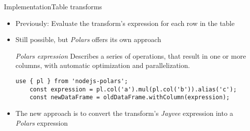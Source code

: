 \begin{frame}[t,fragile]{Implementation}{Table transforms}
	\begin{itemize}
		\item Previously: Evaluate the transform's expression for each row in the table
		\item<2-> Still possible, but \emph{Polars} offers its own approach
		      \begin{block}{\emph{Polars expression}}
			      Describes a series of operations, that result in one or more columns, with automatic optimization and parallelization\footnotemark[1].
			      \small
			      \begin{lstlisting}[caption=Mutiply column "a" and "b"]
	use { pl } from 'nodejs-polars';
	const expression = pl.col('a').mul(pl.col('b')).alias('c');
	const newDataFrame = oldDataFrame.withColumn(expression);
	\end{lstlisting}
		      \end{block}
		\item<3-> The new approach is to convert the transform's \emph{Jayvee} expression into a \emph{Polars} expression
	\end{itemize}


\end{frame}


